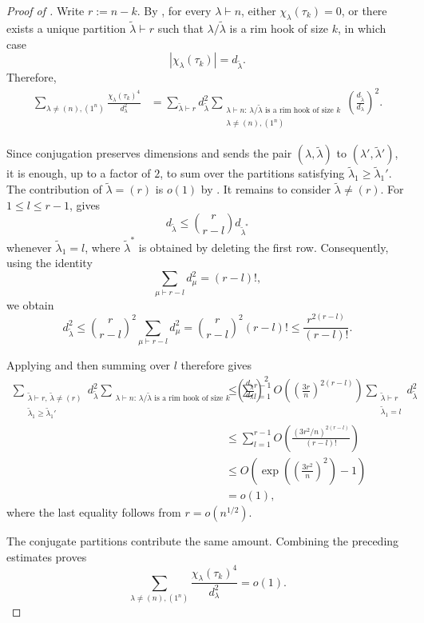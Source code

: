 \begin{proof}[Proof of ]
Write $r:=n-k$. By , for every
$\lambda\vdash n$, either $\chi_\lambda(\tau_k)=0$, or there exists a
unique partition $\widetilde\lambda\vdash r$ such that
$\lambda/\widetilde\lambda$ is a rim hook of size $k$, in which case
$$
|\chi_\lambda(\tau_k)|=d_{\widetilde\lambda}.
$$
Therefore,
\begin{align*}
\sum_{\lambda\neq(n),(1^n)}
\frac{\chi_\lambda(\tau_k)^4}{d_\lambda^2}
&=
\sum_{\widetilde\lambda\vdash r}
d_{\widetilde\lambda}^2
\sum_{\substack{\lambda\vdash n:\,
\lambda/\widetilde\lambda\text{ is a rim hook of size }k\\
\lambda\neq(n),(1^n)}}
\left(\frac{d_{\widetilde\lambda}}{d_\lambda}\right)^2.
\end{align*}

Since conjugation preserves dimensions and sends the pair
$(\lambda,\widetilde\lambda)$ to
$(\lambda',\widetilde\lambda')$, it is enough, up to a factor of $2$,
to sum over the partitions satisfying
$\widetilde\lambda_1\ge\widetilde\lambda_1'$.
The contribution of $\widetilde\lambda=(r)$ is
$o(1)$ by . It remains to consider
$\widetilde\lambda\neq(r)$. For
$1\le l\le r-1$,  gives
$$
d_{\widetilde\lambda}
\le
\binom{r}{r-l}d_{\widetilde\lambda^*}
$$
whenever $\widetilde\lambda_1=l$, where
$\widetilde\lambda^*$ is obtained by deleting the first row. Consequently, using the identity
$$
\sum_{\mu\vdash r-l}d_\mu^2=(r-l)!,
$$
we obtain
$$d_{\widetilde\lambda}^2\le
\binom{r}{r-l}^2
\sum_{\mu\vdash r-l}d_\mu^2=
\binom{r}{r-l}^2(r-l)!\le
\frac{r^{2(r-l)}}{(r-l)!}.$$

Applying  and then summing over
$l$ therefore gives
\begin{align*}
\sum_{\substack{\widetilde\lambda\vdash r,\,
\widetilde\lambda\neq(r)\\
\widetilde\lambda_1\ge\widetilde\lambda_1'}}
d_{\widetilde\lambda}^2
\sum_{\substack{\lambda\vdash n:\,
\lambda/\widetilde\lambda\text{ is a rim hook of size }k}}
\left(\frac{d_{\widetilde\lambda}}{d_\lambda}\right)^2 &\le
\sum_{l=1}^{r-1}
O\left(\left(\frac{3r}{n}\right)^{2(r-l)}
\right)\sum_{\substack{\widetilde\lambda\vdash r\\\widetilde\lambda_1=l}}
d_{\widetilde\lambda}^2 \\
&\le
\sum_{l=1}^{r-1}
O\left(
\frac{(3r^2/n)^{2(r-l)}}{(r-l)!}
\right) \\
&\le
O\left(
\exp\left(\left(\frac{3r^2}{n}\right)^2\right)-1
\right)\\
&=o(1),
\end{align*}
where the last equality follows from $r=o(n^{1/2})$.

The conjugate partitions contribute the same amount. Combining the
preceding estimates proves
$$
\sum_{\lambda\neq(n),(1^n)}
\frac{\chi_\lambda(\tau_k)^4}{d_\lambda^2}
=o(1).
$$
\end{proof}

